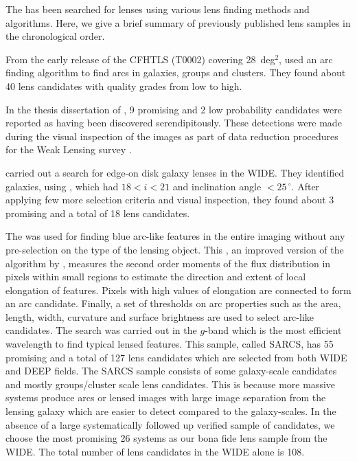 \documentclass[useAMS,usenatbib,a4paper]{mn2e}
\begin{document}
The \cfhtls has been searched for lenses using various lens finding
methods and algorithms. Here, we give a brief summary of previously published lens
samples in the chronological order.

From the early release of the CFHTLS (T0002) covering 28~deg$^2$,
\citet{Cabanac2007} used an arc finding algorithm \citep{Alard2006} to
find arcs in galaxies, groups and clusters. They found about 40 lens
candidates with quality grades from low to high.

In the thesis dissertation of \citet{Thanjavur2009}, 9 promising and 2
low probability candidates were reported as having been discovered
serendipitously. These detections were made during the visual
inspection of the \cfhtls images as part of data reduction procedures
for the Weak Lensing survey \citep{Benjamin2007}.

\citet{Sygnet2010} carried out a search for edge-on disk galaxy lenses in the
\cfhtls WIDE. They identified galaxies, using \sextractor, which
had $18<i<21$ and inclination angle $<25\,^{\circ}$. After applying few more
selection criteria and visual inspection, they found about 3 promising
and a total of 18 lens candidates.

The \af \citep{More2012} was used for finding blue arc-like features in
the entire \cfhtls imaging without any pre-selection on the type of the
lensing object. This \af, an improved version of the algorithm by
\citet{Alard2006}, measures the second order moments of the flux
distribution in pixels within small regions to estimate the direction
and extent of local elongation of features. Pixels with high values of
elongation are connected to form an arc candidate. Finally, a set of
thresholds on arc properties such as the area, length, width, curvature
and surface brightness are used to select arc-like candidates. The
search was carried out in the $g$-band which is the most efficient
wavelength to find typical lensed features.  This sample, called SARCS,
has 55 promising and a total of 127 lens candidates which are selected
from both \cfhtls WIDE and DEEP fields. The SARCS sample consists of
some galaxy-scale candidates and mostly groups/cluster scale lens
candidates. This is because more massive systems produce arcs or lensed
images with large image separation from the lensing galaxy which are
easier to detect compared to the galaxy-scales. In the absence of a
large systematically followed up verified sample of candidates, we
choose the most promising 26 systems as our bona fide lens sample from
the \cfhtls WIDE. The total number of lens candidates in the \cfhtls
WIDE alone is 108.
\end{document}
